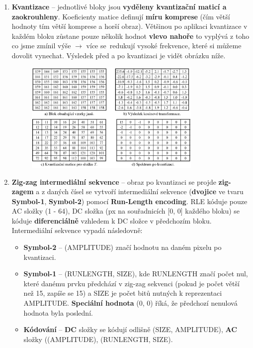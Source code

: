\begin{enumerate}
\begin{figure}[H]
	\end{figure}
	\item \textbf{Kvantizace} -- jednotlivé bloky jsou \textbf{vyděleny kvantizační maticí a zaokrouhleny}. Koeficienty matice definují \textbf{míru komprese} (čím větší hodnoty tím větší komprese a horší obraz). Většinou po aplikaci kvantizace v každém bloku zůstane pouze několik hodnot \textbf{vlevo nahoře} to vyplývá z toho co jsme zmínil výše $\rightarrow$ více se redukují vysoké frekvence, které si můžeme dovolit vynechat. Výsledek před a po kvantizaci je vidět obrázku níže.
	\begin{figure}[H]
		\centering
		\includegraphics[width=0.8\textwidth]{assets/7_kvantizace}
	\end{figure}
	\item \textbf{Zig-zag intermediální sekvence} -- obraz po kvantizaci se projde \textbf{zig-zagem} a z daných čísel se vytvoří intermediální sekvence (\textbf{dvojice} ve tvaru \textbf{Symbol-1}, \textbf{Symbol-2}) pomocí \textbf{Run-Length encoding}. RLE kóduje pouze AC složky (1 - 64), DC složka (px na souřadnicích [0, 0] každého bloku) se kóduje \textbf{diferenciálně} vzhledem k DC složce v předchozím bloku. Intermediální sekvence vypadá následovně:
	\begin{itemize}
		\item \textbf{Symbol-2} -- (AMPLITUDE) značí hodnotu na daném pixelu po kvantizaci.
		\item \textbf{Symbol-1} -- (RUNLENGTH, SIZE), kde RUNLENGTH značí počet nul, které danému prvku předchází v zig-zag sekvenci (pokud je počet větší než 15, zapíše se 15) a SIZE je počet bitů nutných k reprezentaci AMPLITUDE. \textbf{Speciální hodnota} (0, 0) říká, že předchozí nenulová hodnota byla poslední.
		\item \textbf{Kódování} -- \textbf{DC} složky se kódují odlišně (SIZE, AMPLITUDE), \textbf{AC} složky ((AMPLITUDE), (RUNLENGTH, SIZE).

\end{itemize}
\end{enumerate}
